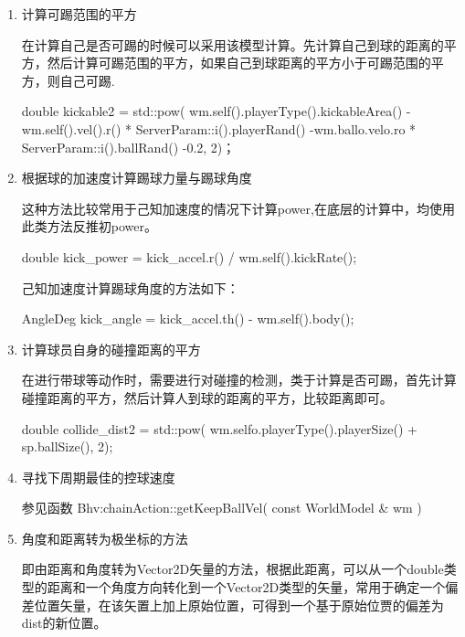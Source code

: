 \begin{enumerate}
	\item 计算可踢范围的平方

在计算自己是否可踢的时候可以采用该模型计算。先计算自己到球的距离的平方，然后计算可踢范围的平方，如果自己到球距离的平方小于可踢范围的平方，则自己可踢.

\begin{Code}
double kickable2 = std::pow( wm.self().playerType().kickableArea()
		-wm.self().vel().r() * ServerParam::i().playerRand()
		-wm.ballo.velo.ro * ServerParam::i().ballRand() 
		-0.2,
		2)；	
\end{Code}


	\item 根据球的加速度计算踢球力量与踢球角度

这种方法比较常用于己知加速度的情况下计算power,在底层的计算中，均使用此类方法反推初power。

\begin{Code}
	double kick_power = kick_accel.r() / wm.self().kickRate();
\end{Code}

己知加速度计算踢球角度的方法如下：

\begin{Code}
	AngleDeg kick_angle = kick_accel.th() - wm.self().body();
\end{Code}

	\item 计算球员自身的碰撞距离的平方

在进行带球等动作时，需要进行对碰撞的检测，类于计算是否可踢，首先计算碰撞距离的平方，然后计算人到球的距离的平方，比较距离即可。

\begin{Code}
	double collide_dist2 =
		std::pow( wm.selfo.playerType().playerSize() + sp.ballSize(), 2);
\end{Code}


	\item 寻找下周期最佳的控球速度
	
\begin{Code}
	参见函数 Bhv:chainAction::getKeepBallVel( const WorldModel & wm )
\end{Code}


	\item 角度和距离转为极坐标的方法

即由距离和角度转为Vector2D矢量的方法，根据此距离，可以从一个double类型的距离和一个角度方向转化到一个Vector2D类型的矢量，常用于确定一个偏差位置矢量，在该矢置上加上原始位置，可得到一个基于原始位贾的偏差为dist的新位置。


\end{enumerate}
